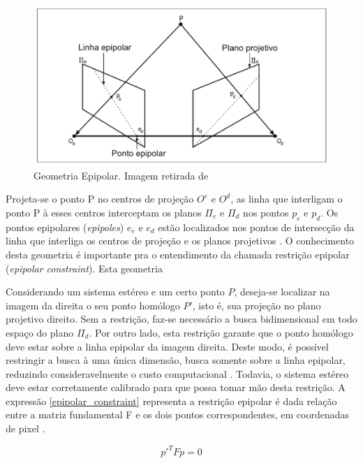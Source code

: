 \begin{figure}[H]
 	\centering
 	\includegraphics[scale=0.35]{./Resources/bradski/geometry_epipolar.png}
 	\caption{Geometria Epipolar. Imagem retirada de \cite{Mendes2012}}
 	\label{geometry_epipolar}
\end{figure}

Projeta-se o ponto P no centros de projeção $O^e$ e $O^d$, as linha que interligam o ponto P à esses centros interceptam os planos $\Pi_e$ e $\Pi_d$ nos pontos $p_e$ e $p_d$. Os pontos epipolares (\textit{epipoles}) $e_e$ e $e_d$ estão localizados nos pontos de intersecção da linha que interliga os centros de projeção e os planos projetivos \cite{Mendes2012}. O conhecimento desta geometria é importante pra o entendimento da chamada restrição epipolar (\textit{epipolar constraint}). Esta geometria 

Considerando um sistema estéreo e um certo ponto $P$, deseja-se localizar na imagem da direita o seu ponto homólogo $P'$, isto é, sua projeção no plano projetivo direito. Sem a restrição, faz-se necessário a busca bidimensional em todo espaço do plano $\Pi_d$. Por outro lado, esta restrição garante que o ponto homólogo deve estar sobre a linha epipolar da imagem direita. Deste modo, é possível restringir a busca à uma única dimensão, busca somente sobre a linha epipolar, reduzindo consideravelmente o custo computacional \cite{Bradski2008}. Todavia, o sistema estéreo deve estar corretamente calibrado para que possa tomar mão desta restrição. A expressão \ref{epipolar_constraint} representa a restrição epipolar é dada relação entre a matriz fundamental F e os dois pontos correspondentes, em coordenadas de pixel \cite{RobertLaganiere}.

\begin{equation}
 \label{epipolar_constraint}
 p'^TFp = 0
\end{equation}

